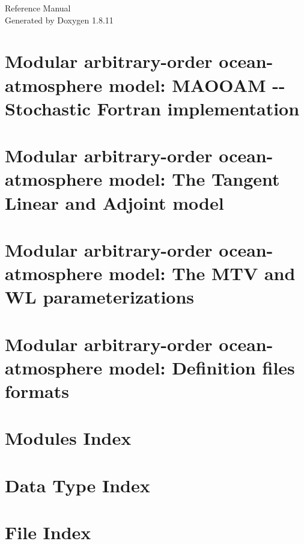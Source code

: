 \documentclass[twoside]{book}
\newcommand{\+}{\discretionary{\mbox{\scriptsize$\hookleftarrow$}}{}{}}
\newcommand{\clearemptydoublepage}{%
  \newpage{\pagestyle{empty}\cleardoublepage}%
}
\begin{document}
\hypersetup{pageanchor=false,
             bookmarksnumbered=true,
             pdfencoding=unicode
            }
\begin{titlepage}
\vspace*{7cm}
\begin{center}%
{\Large Reference Manual}\\
\vspace*{1cm}
{\large Generated by Doxygen 1.8.11}\\
\end{center}
\end{titlepage}
\clearemptydoublepage
\tableofcontents
\clearemptydoublepage
{}
\hypersetup{pageanchor=true}

\chapter{Modular arbitrary-\/order ocean-\/atmosphere model\+: M\+A\+O\+O\+AM -\/-\/ Stochastic Fortran implementation}
\label{index}\hypertarget{index}{}
\chapter{Modular arbitrary-\/order ocean-\/atmosphere model\+: The Tangent Linear and Adjoint model}
\label{md_doc_tl_ad_doc}
\hypertarget{md_doc_tl_ad_doc}{}

\chapter{Modular arbitrary-\/order ocean-\/atmosphere model\+: The M\+TV and WL parameterizations}
\label{md_doc_sto_doc}
\hypertarget{md_doc_sto_doc}{}

\chapter{Modular arbitrary-\/order ocean-\/atmosphere model\+: Definition files formats}
\label{md_doc_def_doc}
\hypertarget{md_doc_def_doc}{}

\chapter{Modules Index}

\chapter{Data Type Index}

\chapter{File Index}

\end{document}
